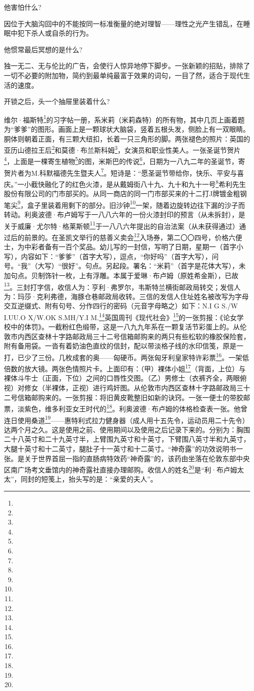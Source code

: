 \par 他害怕什么?
\par 因位于大脑沟回中的不能按同一标准衡量的绝对理智——理性之光产生错乱，在睡眠中犯下杀人或自杀的行为。
\par 他惯常最后冥想的是什么?
\par 独一无二、无与伦比的广告，会使行人惊异地停下脚步。一张新颖的招贴，排除了一切不必要的附加物，简约到最单纯最富于效果的词句，一目了然，适合于现代生活的速度。
\par 开锁之后，头一个抽屉里装着什么?
\par 维尔·福斯特\footnote{}的习字帖一册，系米莉（米莉森特）的所有物，其中几页上画着题为“爹爹”的图形。画面上是一颗球状大脑袋，竖着五根头发，侧脸上有一双眼睛。胴体则朝着正面，有三颗大纽扣，长着一只三角形的脚。两张褪色的照片：英国的亚历山德拉王后\footnote{}和莫德·布兰斯科姆\footnote{}，女演员和职业性美人。一张圣诞节贺片\footnote{}，上面是一棵寄生植物\footnote{}的图，米斯巴的传说\footnote{}，日期为一八九二年的圣诞节，寄贺片者为M.科默福德先生暨夫人\footnote{}。短诗是：“愿圣诞节带给你，快乐、平安与喜庆。”一小截快融化了的红色火漆，是从戴姆街八十九、九十和九十一号\footnote{}希利先生股份有限公司的门市部买的。从同一商店的同一门市部买来的十二打J牌镀金粗钢笔尖\footnote{}，盒子里装着用剩下的部分。旧沙钟\footnote{}一架，随着边旋转边往下漏的沙子而转动。利奥波德·布卢姆写于一八八六年的一份火漆封印的预言（从未拆封），是关于威廉·尤尔特·格莱斯顿\footnote{}于一八八六年提出的自治法案（从未获得通过）通过后的前景的。在圣凯文举行的慈善义卖会\footnote{}入场券，第二〇〇四号，价格六便士，为中彩者备有一百个奖品。幼儿写的一封信，写明了日期，星期一（首字小写），内容如下：“爹爹”（首字大写），逗点，“你好吗”（首字大写），问号。“我”（大写）“很好”。句点。另起段。署名：“米莉”（首字是花体大写），未加句点。贝制饰针一枚，上有浮雕。本属于爱琳·布卢姆（原姓希金斯），已故\footnote{}。三封打字信，收信人为：亨利·弗罗尔，韦斯特兰横街邮政局转交；发信人为：玛莎·克利弗德，海豚仓巷邮政局收转。三信的发信人住址姓名被改写为字母交互逆缀式、附有句号、分作四行的密码（元音字母略之）如下：N.I G S./W I.UU.O X/W.OK S.MH/Y.I M.\footnote{}英国周刊《现代社会》\footnote{}的一张剪报：《论女学校中的体罚》。一截粉红色缎带，这是一八九九年系在一颗复活节彩蛋上的。从伦敦市内西区查林十字路邮政局三十二号信箱邮购来的两只有些松软的橡胶保险套，附有备用袋。一沓有着奶油色直纹的信封，配以带淡格子线的水印信笺，原是一打，已少了三份。几枚成套的奥——匈硬币。两张匈牙利皇家特许彩票\footnote{}。一架低倍数的放大镜。两张色情照片卡。上面印有：（甲）裸体小姐\footnote{}（背面，上位）与裸体斗牛士（正面，下位）之间的口唇性交图。（乙）男修士（衣裤齐全，两眼俯视）对修女（半裸体，正视）进行鸡奸图。从伦敦市内西区查林十字路邮政局三十二号信箱邮购来的。一张剪报：将旧黄皮靴整旧如新的诀窍。一张一便士的带胶邮票，淡紫色，维多利亚女王时代的\footnote{}。利奥波德·布卢姆的体格检查表一张。他曾连日使用桑道\footnote{}——惠特利式拉力健身器（成人用十五先令，运动员用二十先令）达两个月之久。这是使用之前、使用期间以及使用之后记录下来的。分别为：胸围二十八英寸和二十九英寸半，上臂围九英寸和十英寸，下臂围八英寸半和九英寸，大腿十英寸和十二英寸，腿肚子十一英寸和十二英寸。“神奇露”的功效说明书一张。是关于世界首屈一指的直肠病特效药“神奇露”的，该药由坐落在伦敦东部中央区南广场考文垂馆内的神奇露社直接办理邮购。收信人的姓名\footnote{}是“利·布卢姆太太”，同封的短笺上，抬头写的是：“亲爱的夫人”。
